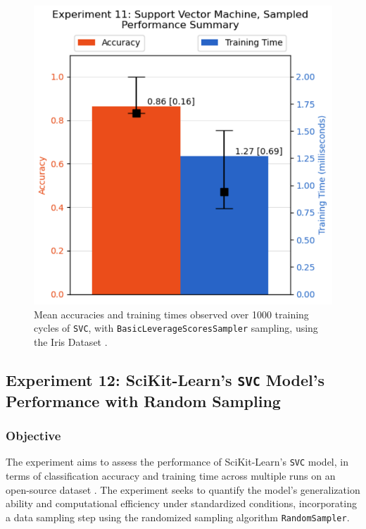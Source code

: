 \documentclass{article}
\theoremstyle{plain}
\theoremstyle{definition}
\theoremstyle{remark}
\begin{document}
\begin{figure}[ht]
	\vskip 0.2in
	\begin{center}
		\centerline{\includegraphics[width=\columnwidth]{experiment_11}}
		\caption{Mean accuracies and training times observed over 1000 training cycles of \texttt{SVC}, with \texttt{BasicLeverageScoresSampler} sampling, using the Iris Dataset \cite{iris}.}
		\label{experiment_11}
	\end{center}
	\vskip -0.2in
\end{figure}


\subsection{Experiment 12: SciKit-Learn's \texttt{SVC} Model's Performance with Random Sampling}

\subsubsection{Objective}

The experiment aims to assess the performance of SciKit-Learn's \texttt{SVC} model, in terms of classification accuracy and training time across multiple runs on an open-source dataset \cite{iris}. The experiment seeks to quantify the model's generalization ability and computational efficiency under standardized conditions, incorporating a data sampling step using the randomized sampling algorithm \texttt{RandomSampler}.
\end{document}
